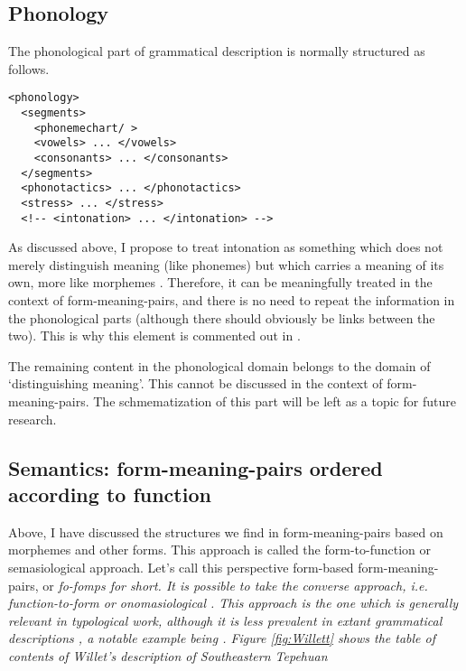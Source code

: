 \subsection{Phonology}
The phonological part of grammatical description is normally structured as follows.

\ea\label{xml:phonology}
\begin{verbatim} 
<phonology>
  <segments>
    <phonemechart/ >
    <vowels> ... </vowels>
    <consonants> ... </consonants>
  </segments>
  <phonotactics> ... </phonotactics>
  <stress> ... </stress>
  <!-- <intonation> ... </intonation> -->
\end{verbatim}
\z

As discussed above, I propose to treat intonation as something which does not merely distinguish meaning (like phonemes) but which carries a meaning of its own, more like morphemes \citep[cf.][]{Mosel2006craft}.  Therefore, it can be meaningfully treated in the context of form-meaning-pairs, and there is no need to repeat the information in the phonological parts (although there should obviously be links between the two). This is why this element is commented out in .

The remaining content in the phonological domain belongs to the domain of `distinguishing meaning'. This cannot be discussed in the context of form-meaning-pairs. The schmematization of this part will be left as a topic for future research.
 
\subsection{Semantics: form-meaning-pairs ordered according to function}
Above, I have discussed the structures we find in form-meaning-pairs based on morphemes and other forms.  This approach is called the form-to-function or semasiological approach. Let's call this perspective form-based form-meaning-pairs, or \em fo-fomps \em for short. It is possible to take the converse approach, i.e. function-to-form or onomasiological \citep{Gabelentz1891,Jespersen1924}. This approach is the one which is generally relevant in typological work, although it is less prevalent in extant grammatical descriptions \citep{Lehmann1980,
Comrie1998,
Lehmann1998,Lehmann2004funkt,
SchultzeBerndt1998,
Cristofaro2006,
Mosel2006craft,
Payne2006,
Zaefferer2006}, a notable example being \citep{Willett1991}. Figure \ref{fig:Willett} shows the table of contents of Willet's description of Southeastern Tepehuan

